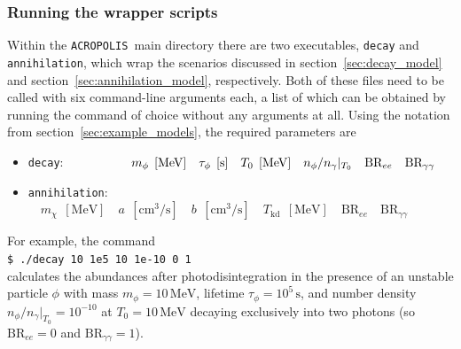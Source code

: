 \documentclass[11pt,a4paper]{article}
\newcommand{\cmd}[1]{\vspace{0.3cm}\texttt{\$ #1}\\[0.3cm]}
\newcommand{\acropolis}{\texttt{ACROPOLIS}~}
\begin{document}
\subsubsection{Running the wrapper scripts}
Within the \acropolis main directory there are two executables, \texttt{decay} and \texttt{annihilation}, which wrap the scenarios discussed in section~\ref{sec:decay_model} and section~\ref{sec:annihilation_model}, respectively. Both of these files need to be called with six command-line arguments each, a list of which can be obtained by running the command of choice without any arguments at all. Using the notation from section~\ref{sec:example_models}, the required parameters are
\begin{itemize}
	\item \texttt{decay}: $\hspace{1.8cm} m_\phi\;\,[\mathrm{MeV}] \quad \tau_\phi\;\,[\mathrm{s}] \quad T_0\;\,[\mathrm{MeV}] \quad n_\phi/n_\gamma|_{T_0} \quad \text{BR}_{ee} \quad \text{BR}_{\gamma\gamma}$
	\item \texttt{annihilation}: $\quad m_\chi\;\,[\mathrm{MeV}] \quad a\;\,[\mathrm{cm^3/s}] \quad b\;\,[\mathrm{cm^3/s}] \quad T_\text{kd}\;\,[\mathrm{MeV}] \quad \text{BR}_{ee} \quad \text{BR}_{\gamma\gamma}$
\end{itemize}
For example, the command\\[4mm]
\cmd{./decay 10 1e5 10 1e-10 0 1}
calculates the abundances after photodisintegration in the presence of an unstable particle $\phi$ with mass $m_\phi=10\,\mathrm{MeV}$, lifetime $\tau_\phi=10^5\,\mathrm{s}$, and number density $ n_\phi/n_\gamma|_{T_0} = 10^{-10}$ at $T_0=10\,\mathrm{MeV}$ decaying exclusively into two photons (so $\text{BR}_{ee} = 0$ and $\text{BR}_{\gamma\gamma}=1$).
\end{document}
